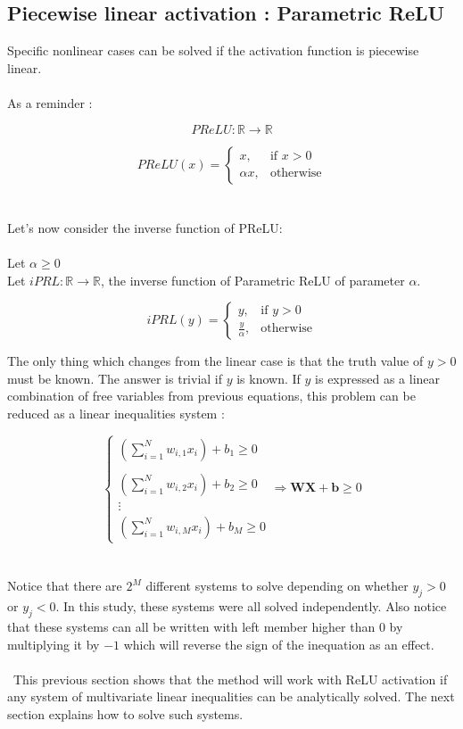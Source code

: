 \documentclass{article}
\begin{document}
\subsection{Piecewise linear activation : Parametric ReLU }
Specific nonlinear cases can be solved if the activation function is piecewise linear.
\\
\\
As a reminder :


\begin{equation*}
    PReLU : \mathbb{R} \longrightarrow \mathbb{R}
\end{equation*}

\[
    PReLU(x)= 
\begin{cases}
    x,& \text{if } x>0\\
    \alpha x, & \text{otherwise}
\end{cases}
\]
\\
\\
Let's now consider the inverse function of PReLU:
\\
\\
Let $\alpha \geqslant 0$
\\
Let $iPRL : \mathbb{R} \longrightarrow \mathbb{R}$, the inverse function of Parametric ReLU of parameter $\alpha$.


\[
    iPRL(y)= 
\begin{cases}
    y,& \text{if } y>0\\
    \frac{y}{\alpha}, & \text{otherwise}
\end{cases}
\]


The only thing which changes from the linear case is that the truth value of $y > 0$ must be known.
The answer is trivial if $y$ is known. If $y$ is expressed as a linear combination of free variables from previous equations,
this problem can be reduced as a linear inequalities system :


\begin{equation}
\begin{cases}
    (\sum_{i=1}^{N} w_{i,1}x_{i}) + b_{1} \geqslant  0
    \\\\ (\sum_{i=1}^{N} w_{i,2}x_{i}) + b_{2} \geqslant 0
    \\ \vdots 
    \\ (\sum_{i=1}^{N} w_{i,M}x_{i}) + b_{M} \geqslant  0
\end{cases}
\Rightarrow
\textbf{WX} + \textbf{b} \geqslant  0
\end{equation}
\\\\
Notice that there are $2^{M}$ different systems to solve depending on whether $y_{j}>0$ or $y_{j}<0$.
In this study, these systems were all solved independently.
Also notice that these systems can all be written with left member higher than $0$ by multiplying it by $-1$ 
which will reverse the sign of the inequation as an effect.
\\\\
\
This previous section shows that the method will work with ReLU activation if any system of multivariate linear inequalities can be analytically solved.
The next section explains how to solve such systems.
\end{document}
